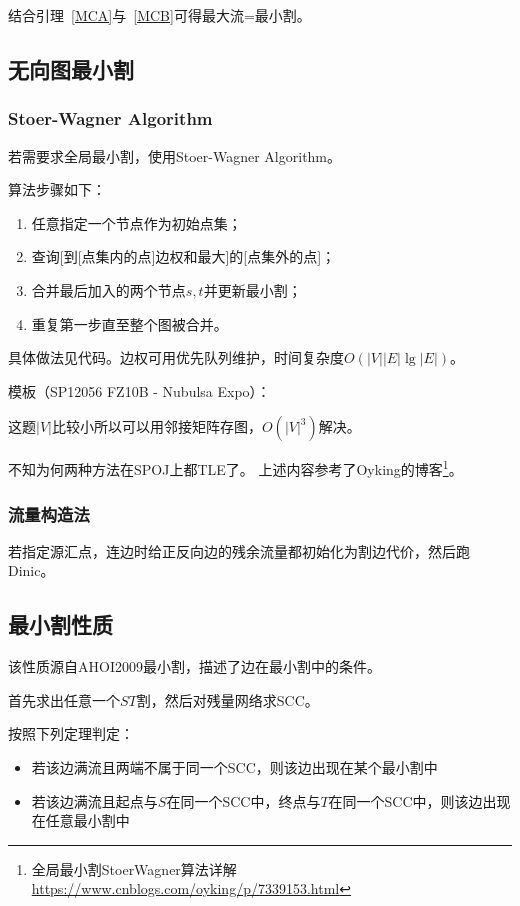 结合引理~\ref{MCA}与~\ref{MCB}可得最大流=最小割。
\subsection{无向图最小割}
\subsubsection{Stoer-Wagner Algorithm}
若需要求全局最小割，使用Stoer-Wagner Algorithm。

算法步骤如下：
\begin{enumerate}
	\item 任意指定一个节点作为初始点集；
	\item 查询[到[点集内的点]边权和最大]的[点集外的点]；
	\item 合并最后加入的两个节点$s,t$并更新最小割；
	\item 重复第一步直至整个图被合并。
\end{enumerate}
具体做法见代码。边权可用优先队列维护，时间复杂度$O(|V||E|\lg |E|)$。

模板（SP12056 FZ10B - Nubulsa Expo）：


这题$|V|$比较小所以可以用邻接矩阵存图，$O(|V|^3)$解决。


不知为何两种方法在SPOJ上都TLE了。
上述内容参考了Oyking的博客\footnote{
	全局最小割StoerWagner算法详解
	\url{https://www.cnblogs.com/oyking/p/7339153.html}
}。
\subsubsection{流量构造法}
若指定源汇点，连边时给正反向边的残余流量都初始化为割边代价，然后跑Dinic。
\subsection{最小割性质}
该性质源自AHOI2009最小割，描述了边在最小割中的条件。

首先求出任意一个$ST$割，然后对残量网络求SCC。

按照下列定理判定：
\begin{itemize}
	\item 若该边满流且两端不属于同一个SCC，则该边出现在某个最小割中
	\item 若该边满流且起点与$S$在同一个SCC中，终点与$T$在同一个SCC中，则该边出现在任意最小割中
\end{itemize}
